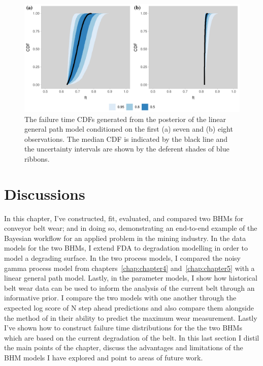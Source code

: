 \begin{figure}
  \centering
  \includegraphics[width=\textwidth]{figures/ch-6/belt_wear_failuretime_CDF_lm.pdf}
  \caption{The failure time CDFs generated from the posterior of the linear general path model conditioned on the first (a) seven and (b) eight observations. The median CDF is indicated by the black line and the uncertainty intervals are shown by the deferent shades of blue ribbons.}
  \label{fig:beltwear-ft-lm}
\end{figure}

\section{Discussions} \label{sec:belt-wear-discussion}

In this chapter, I've constructed, fit, evaluated, and compared two BHMs for conveyor belt wear; and in doing so, demonstrating an end-to-end example of the Bayesian workflow for an applied problem in the mining industry. In the data models for the two BHMs, I extend FDA to degradation modelling in order to model a degrading surface. In the two process models, I compared the noisy gamma process model from chapters~\ref{chap:chapter4} and~\ref{chap:chapter5} with a linear general path model. Lastly, in the parameter models, I show how historical belt wear data can be used to inform the analysis of the current belt through an informative prior. I compare the two models with one another through the expected log score of N step ahead predictions and also compare them alongside the method of \cite{webb_2020} in their ability to predict the maximum wear measurement. Lastly I've shown how to construct failure time distributions for the the two BHMs which are based on the current degradation of the belt. In this last section I distil the main points of the chapter, discuss the advantages and limitations of the BHM models I have explored and point to areas of future work.

